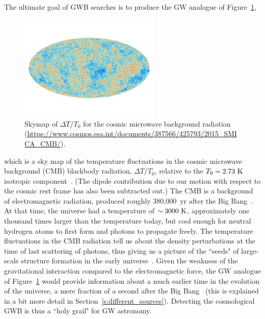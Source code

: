 The ultimate goal of GWB searches is to produce 
the GW analogue of Figure~\ref{f:CMB},
%
\begin{figure}[htbp!]
\begin{center}
\includegraphics[width=0.6\textwidth]{Figures/CMB}
\caption{Skymap of $\Delta T/T_0$ for the cosmic microwave background
radiation
(\url{https://www.cosmos.esa.int/documents/387566/425793/2015_SMICA_CMB/}).}
\label{f:CMB}
\end{center}
\end{figure}
%
which is a sky map of the temperature fluctuations in 
the cosmic microwave background (CMB) 
blackbody radiation, $\Delta T/T_0$, relative 
to the $T_0 = 2.73~{\rm K}$ isotropic 
component~\cite{Penzias-Wilson:1965, Dicke-et-al:1965}.
(The dipole contribution due to our motion with respect 
to the cosmic rest frame has also been subtracted out.)
The CMB is a background of electromagnetic
radiation, produced roughly 380,000~yr after the Big 
Bang~\cite{Kolb-Turner:1999, Ryden:2003}.
At that time, the universe had a temperature of 
$\sim 3000~{\rm K}$, approximately one thousand times 
larger than the temperature today, but cool enough for 
neutral hydrogen atoms to first form and photons to 
propagate freely.
The temperature fluctuations in the CMB radiation tell
us about the density perturbations at the time of 
last scattering of photons, 
thus giving us a picture of the ``seeds" of 
large-scale structure formation in the early 
universe~\cite{COBE:1992, CMB-anisotropies-Planck-Planck:2019}.
Given the weakness of the gravitational interaction 
compared to the electromagnetic force, the GW analogue 
of Figure~\ref{f:CMB} would provide information about
a much earlier time in the evolution of the universe,
a mere fraction of a second after the Big 
Bang~\cite{Allen:1997, Maggiore:2000} 
(this is explained in a bit more detail in 
Section~\ref{s:different_sources}).  
Detecting the cosmological GWB is thus a ``holy grail" 
for GW astronomy.

